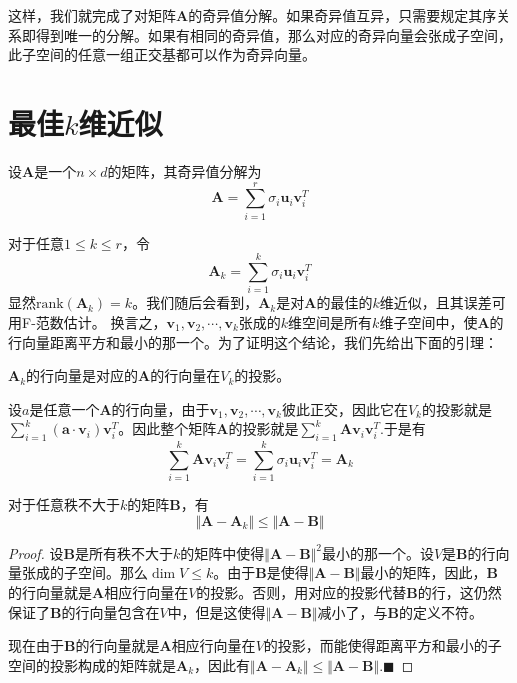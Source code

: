 \documentclass[UTF8]{ctexbook}
\newcommand{\Frobenius}[1]{\Vert #1 \Vert}
\newcommand{\asf}[2]{$#1_1, #1_2, \cdots, #1_#2$}
\begin{document}
	这样，我们就完成了对矩阵$\bm A$的奇异值分解。如果奇异值互异，只需要规定其序关系即得到唯一的分解。如果有相同的奇异值，那么对应的奇异向量会张成子空间，此子空间的任意一组正交基都可以作为奇异向量。

\section{最佳$k$维近似}
	设$\bm A$是一个$n \times d$的矩阵，其奇异值分解为
	\begin{equation}
		\bm A = \sum_{i=1}^r \sigma_i \bm u_i \bm v_i^T
	\end{equation}
	
	对于任意$1 \le k \le r$，令
	\begin{equation}
		\bm A_k = \sum_{i=1}^k \sigma_i \bm u_i \bm v_i^T
	\end{equation}
	显然$\text{rank}(\bm A_k) = k$。我们随后会看到，$\bm A_k$是对$\bm A$的最佳的$k$维近似，且其误差可用F-范数估计。
	换言之，\asf{\bm v}{k}张成的$k$维空间是所有$k$维子空间中，使$\bm A$的行向量距离平方和最小的那一个。为了证明这个结论，我们先给出下面的引理：
	\begin{lemma}
		$\bm A_k$的行向量是对应的$\bm A$的行向量在$V_k$的投影。
	\end{lemma}
	\begin{lproof}
		设$a$是任意一个$\bm A$的行向量，由于\asf{\bm v}{k}彼此正交，因此它在$V_k$的投影就是$\sum_{i=1}^k (\bm a \cdot \bm v_i) \bm v_i^T$。因此整个矩阵$\bm A$的投影就是$\sum_{i=1}^k \bm A \bm v_i \bm v_i^T$.于是有
		\begin{equation}
			\sum_{i=1}^k \bm A \bm v_i \bm v_i^T = \sum_{i=1}^k \sigma_i \bm u_i \bm v_i^T = \bm A_k
		\end{equation}
	\end{lproof}
	\begin{thm}
		对于任意秩不大于$k$的矩阵$\bm B$，有
		\begin{equation}
			\Frobenius{\bm A - \bm A_k} \le \Frobenius{\bm A - \bm B}
		\end{equation}
	\end{thm}
	\begin{proof}
		设$\bm B$是所有秩不大于$k$的矩阵中使得$\Frobenius{\bm A - \bm B}^2$最小的那一个。设$V$是$\bm B$的行向量张成的子空间。那么$\dim V \le k$。由于$\bm B$是使得$\Frobenius{\bm A - \bm B}$最小的矩阵，因此，$\bm B$的行向量就是$\bm A$相应行向量在$V$的投影。否则，用对应的投影代替$\bm B$的行，这仍然保证了$\bm B$的行向量包含在$V$中，但是这使得$\Frobenius{\bm A - \bm B}$减小了，与$\bm B$的定义不符。

		现在由于$\bm B$的行向量就是$\bm A$相应行向量在$V$的投影，而能使得距离平方和最小的子空间的投影构成的矩阵就是$\bm A_k$，因此有$\Frobenius{\bm A - \bm A_k} \le \Frobenius{\bm A - \bm B}$.$\blacksquare$
		
	\end{proof}
\end{document}
